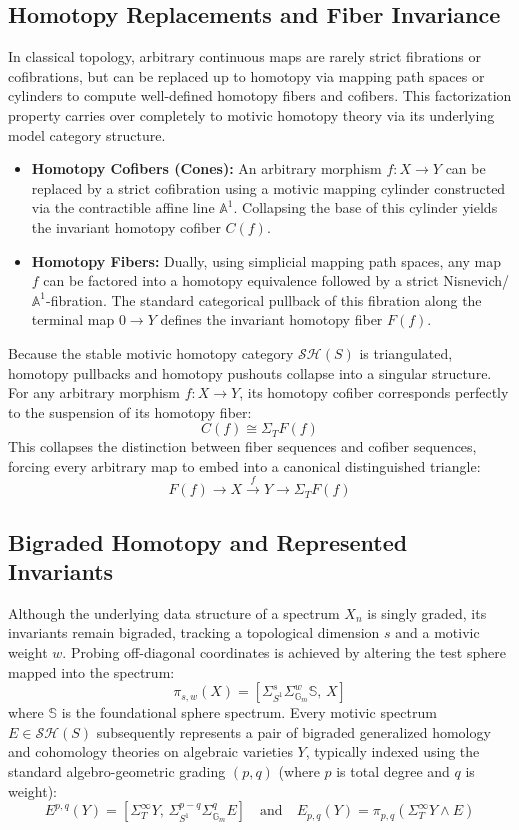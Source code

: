 \documentclass[11pt,oneside]{article}
\begin{document}
\subsection{Homotopy Replacements and Fiber Invariance}
In classical topology, arbitrary continuous maps are rarely strict fibrations or cofibrations, but can be replaced up to homotopy via mapping path spaces or cylinders to compute well-defined homotopy fibers and cofibers. This factorization property carries over completely to motivic homotopy theory via its underlying model category structure.
\begin{itemize}
    \item \textbf{Homotopy Cofibers (Cones):} An arbitrary morphism $f: X \to Y$ can be replaced by a strict cofibration using a motivic mapping cylinder constructed via the contractible affine line $\mathbb{A}^1$. Collapsing the base of this cylinder yields the invariant homotopy cofiber $C(f)$.
    \item \textbf{Homotopy Fibers:} Dually, using simplicial mapping path spaces, any map $f$ can be factored into a homotopy equivalence followed by a strict Nisnevich/$\mathbb{A}^1$-fibration. The standard categorical pullback of this fibration along the terminal map $0 \to Y$ defines the invariant homotopy fiber $F(f)$.
\end{itemize}
Because the stable motivic homotopy category $\mathcal{S}\mathcal{H}(S)$ is triangulated, homotopy pullbacks and homotopy pushouts collapse into a singular structure. For any arbitrary morphism $f: X \to Y$, its homotopy cofiber corresponds perfectly to the suspension of its homotopy fiber:
\[ C(f) \cong \Sigma_T F(f) \]
This collapses the distinction between fiber sequences and cofiber sequences, forcing every arbitrary map to embed into a canonical distinguished triangle:
\[ F(f) \longrightarrow X \xrightarrow{\ f\ } Y \longrightarrow \Sigma_T F(f) \]

\subsection{Bigraded Homotopy and Represented Invariants}
Although the underlying data structure of a spectrum $X_n$ is singly graded, its invariants remain bigraded, tracking a topological dimension $s$ and a motivic weight $w$. Probing off-diagonal coordinates is achieved by altering the test sphere mapped into the spectrum:
\[ \pi_{s,w}(X) = \left[ \Sigma_{S^1}^s \Sigma_{\mathbb{G}_m}^w \mathbb{S}, \, X \right] \]
where $\mathbb{S}$ is the foundational sphere spectrum. Every motivic spectrum $E \in \mathcal{S}\mathcal{H}(S)$ subsequently represents a pair of bigraded generalized homology and cohomology theories on algebraic varieties $Y$, typically indexed using the standard algebro-geometric grading $(p,q)$ (where $p$ is total degree and $q$ is weight):
\[ E^{p,q}(Y) = \left[ \Sigma_T^\infty Y, \, \Sigma_{S^1}^{p-q} \Sigma_{\mathbb{G}_m}^q E \right] \quad \text{and} \quad E_{p,q}(Y) = \pi_{p,q}\left( \Sigma_T^\infty Y \wedge E \right) \]
\end{document}
